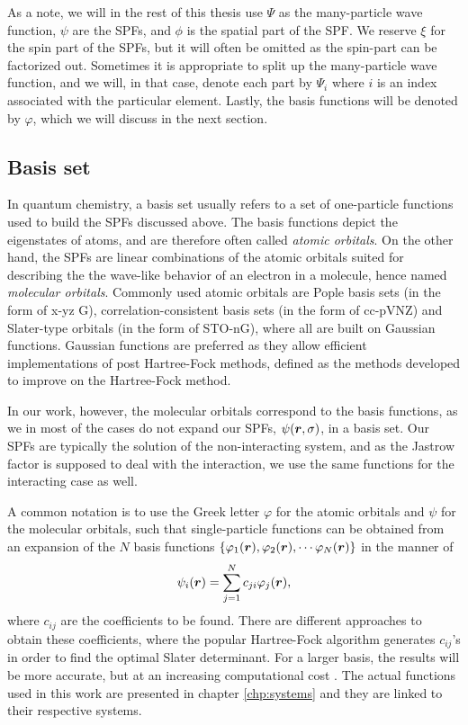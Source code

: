 As a note, we will in the rest of this thesis use $\Psi$ as the many-particle wave function, $\psi$ are the SPFs, and $\phi$ is the spatial part of the SPF. We reserve $\xi$ for the spin part of the SPFs, but it will often be omitted as the spin-part can be factorized out. Sometimes it is appropriate to split up the many-particle wave function, and we will, in that case, denote each part by $\Psi_i$ where $i$ is an index associated with the particular element. Lastly, the basis functions will be denoted by $\varphi$, which we will discuss in the next section.

\subsection{Basis set} \label{sec:basisset}
In quantum chemistry, a basis set usually refers to a set of one-particle functions used to build the SPFs discussed above. The basis functions depict the eigenstates of atoms, and are therefore often called \textit{atomic orbitals}. On the other hand, the SPFs are linear combinations of the atomic orbitals suited for describing the the wave-like behavior of an electron in a molecule, hence named \textit{molecular orbitals}. Commonly used atomic orbitals are Pople basis sets \supercite{ditchfield_self-consistent_1971} (in the form of x-yz G), correlation-consistent basis sets \supercite{dunning_gaussian_1989} (in the form of cc-pVNZ) and Slater-type orbitals \supercite{slater_atomic_1930} (in the form of STO-nG), where all are built on Gaussian functions. Gaussian functions are preferred as they allow efficient implementations of post Hartree-Fock methods, defined as the methods developed to improve on the Hartree-Fock method.

In our work, however, the molecular orbitals correspond to the basis functions, as we in most of the cases do not expand our SPFs, $\psi(\boldsymbol{{r}},\sigma)$, in a basis set. Our SPFs are typically the solution of the non-interacting system, and as the Jastrow factor is supposed to deal with the interaction, we use the same functions for the interacting case as well.

A common notation is to use the Greek letter $\varphi$ for the atomic orbitals and $\psi$ for the molecular orbitals, such that single-particle functions can be obtained from an expansion of the $N$ basis functions $\{\varphi_1(\boldsymbol{{r}}),\varphi_2(\boldsymbol{{r}}),\cdots\varphi_N(\boldsymbol{{r}})\}$ in the manner of
\begin{equation}
\psi_i(\boldsymbol{{r}})=\sum_{j=1}^Nc_{ji}\varphi_j(\boldsymbol{{r}}),
\label{eq:expansion}
\end{equation}
where $c_{ij}$ are the coefficients to be found. There are different approaches to obtain these coefficients, where the popular Hartree-Fock algorithm generates $c_{ij}$'s in order to find the optimal Slater determinant. For a larger basis, the results will be more accurate, but at an increasing computational cost \supercite{daniel_crawford_introduction_2007}. The actual functions used in this work are presented in chapter \ref{chp:systems} and they are linked to their respective systems. 

